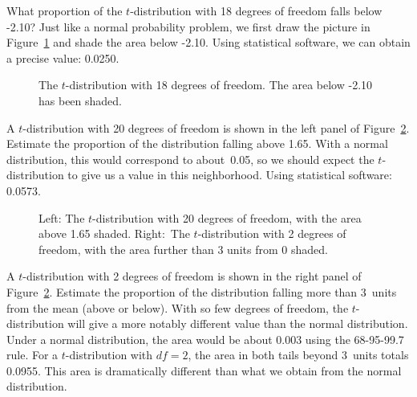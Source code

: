 \begin{examplewrap}
\begin{nexample}{What proportion of the $t$-distribution
    with 18 degrees of freedom falls below -2.10?}
  Just like a normal probability problem, we first draw
  the picture in Figure~\ref{tDistDF18LeftTail2Point10}
  and shade the area below -2.10.
  Using statistical software, we can obtain a precise
  value: 0.0250.
\end{nexample}
\end{examplewrap}

\begin{figure}
  \centering
  \caption{The $t$-distribution with 18 degrees of freedom.
      The area below -2.10 has been shaded.}
  \label{tDistDF18LeftTail2Point10}
\end{figure}

\begin{examplewrap}
\begin{nexample}{A $t$-distribution with 20 degrees of freedom
    is shown in the left panel of
    Figure~\ref{tDistDF20RightTail1Point65}.
    Estimate the proportion of the distribution falling
    above 1.65.}
  With a normal distribution, this would correspond to
  about~0.05, so we should expect the $t$-distribution
  to give us a value in this neighborhood.
  Using statistical software: 0.0573.
\end{nexample}
\end{examplewrap}

\begin{figure}
  \centering
  \caption{Left: The $t$-distribution with 20 degrees
      of freedom, with the area above 1.65 shaded.
      Right:~The $t$-distribution with 2 degrees of freedom,
      with the area further than 3 units from 0 shaded.}
  \label{tDistDF20RightTail1Point65}
\end{figure}

\begin{examplewrap}
\begin{nexample}{A $t$-distribution with 2 degrees of freedom
    is shown in the right panel of
    Figure~\ref{tDistDF20RightTail1Point65}.
    Estimate the proportion of the distribution falling more
    than 3~units from the mean (above or below).}
  With so few degrees of freedom, the $t$-distribution will
  give a more notably different value than the normal
  distribution.
  Under a normal distribution, the area would be about
  0.003 using the 68-95-99.7 rule.
  For a $t$-distribution with $df = 2$, the area in both
  tails beyond 3~units totals 0.0955.
  This area is dramatically different than what
  we obtain from the normal distribution.
\end{nexample}
\end{examplewrap}

